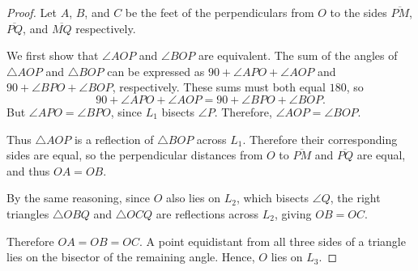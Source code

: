 \begin{proof}
    Let $A$, $B$, and $C$ be the feet of the perpendiculars from $O$ to the sides 
        $\overline{PM}$, $\overline{PQ}$, and $\overline{MQ}$ respectively.

    We first show that $\angle AOP$ and $\angle BOP$
        are equivalent.
    The sum of the angles of $\triangle AOP$ and $\triangle BOP$ can 
        be expressed as $90 + \angle APO + \angle AOP$
        and $90 + \angle BPO + \angle BOP$, respectively.
    These sums must both equal $180$, so
        \[
            90 + \angle APO + \angle AOP = 90 + \angle BPO + \angle BOP.
        \]
    But $\angle APO = \angle BPO$, since $L_1$ bisects $\angle P$.
    Therefore, $\angle AOP = \angle BOP$.

    Thus  $\triangle AOP$ is a reflection of $\triangle BOP$ across $L_1$.
    Therefore their corresponding sides are equal,
        so the perpendicular distances from $O$ to $\overline{PM}$ and $\overline{PQ}$ are equal,
        and thus $OA = OB$.

    By the same reasoning, since $O$ also lies on $L_2$, which bisects $\angle Q$,
    the right triangles $\triangle OBQ$ and $\triangle OCQ$ are reflections across $L_2$,
    giving $OB = OC$.

    Therefore $OA = OB = OC$.
    A point equidistant from all three sides of a triangle lies on the bisector of the remaining angle.
    Hence, $O$ lies on $L_3$.
\end{proof}